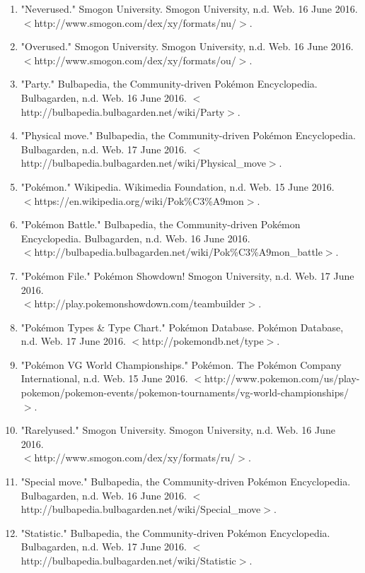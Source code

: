 \documentclass{article}
\begin{document}
\begin{enumerate}
	\item "Neverused." Smogon University. Smogon University, n.d. Web. 16 June 2016. \\$<$http://www.smogon.com/dex/xy/formats/nu/$>$.
	\item "Overused." Smogon University. Smogon University, n.d. Web. 16 June 2016. \\$<$http://www.smogon.com/dex/xy/formats/ou/$>$.
	\item "Party." Bulbapedia, the Community-driven Pokémon Encyclopedia. Bulbagarden, n.d. Web. 16 June 2016. $<$http://bulbapedia.bulbagarden.net/wiki/Party$>$.  
	\item "Physical move." Bulbapedia, the Community-driven Pokémon Encyclopedia. Bulbagarden, n.d. Web. 17 June 2016. $<$http://bulbapedia.bulbagarden.net/wiki/Physical\_move$>$.
	\item "Pokémon." Wikipedia. Wikimedia Foundation, n.d. Web. 15 June 2016. \\$<$https://en.wikipedia.org/wiki/Pok\%C3\%A9mon$>$. 
	\item "Pokémon Battle." Bulbapedia, the Community-driven Pokémon Encyclopedia. Bulbagarden, n.d. Web. 16 June 2016. \\$<$http://bulbapedia.bulbagarden.net/wiki/Pok\%C3\%A9mon\_battle$>$.  
	\item "Pok\'emon File." Pok\'emon Showdown! Smogon University, n.d. Web. 17 June 2016. \\$<$http://play.pokemonshowdown.com/teambuilder$>$.
	\item "Pokémon Types \& Type Chart." Pokémon Database. Pokémon Database, n.d. Web. 17 June 2016. $<$http://pokemondb.net/type$>$. 
	\item "Pokémon VG World Championships." Pok\'emon. The Pok\'emon Company International, n.d. Web. 15 June 2016. $<$http://www.pokemon.com/us/play-pokemon/pokemon-events/pokemon-tournaments/vg-world-championships/$>$.
	\item "Rarelyused." Smogon University. Smogon University, n.d. Web. 16 June 2016. \\$<$http://www.smogon.com/dex/xy/formats/ru/$>$.
	\item "Special move." Bulbapedia, the Community-driven Pokémon Encyclopedia. Bulbagarden, n.d. Web. 16 June 2016. $<$http://bulbapedia.bulbagarden.net/wiki/Special\_move$>$.
	\item  "Statistic." Bulbapedia, the Community-driven Pokémon Encyclopedia. Bulbagarden, n.d. Web. 17 June 2016. $<$http://bulbapedia.bulbagarden.net/wiki/Statistic$>$.

\end{enumerate}
\end{document}
